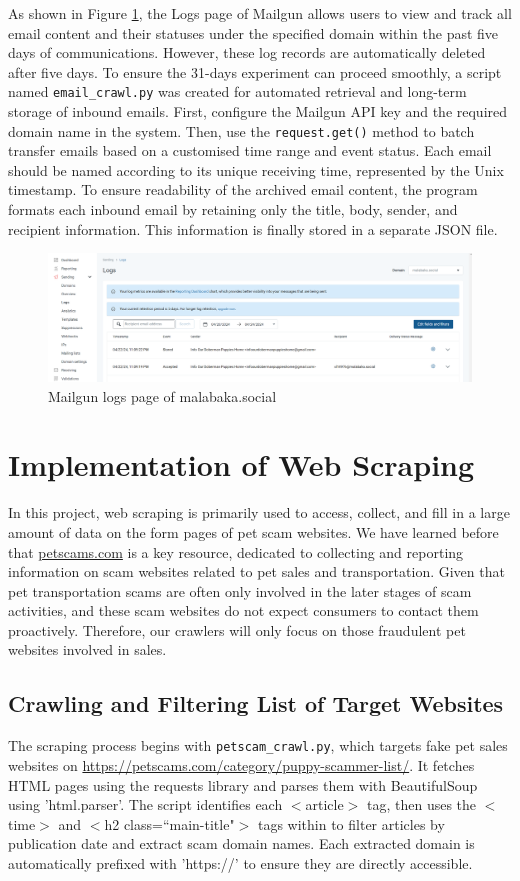 \documentclass[ oneside,%
                    author={Cassie Qing Tang},
                    degree={BSc},
                     title={An Automated Response System for Disrupting Online Pet Scamming \\ },
                    subtitle={ }]{dissertation}
\begin{document}
As shown in Figure \ref{fig:pic4}, the Logs page of Mailgun allows users to view and track all email content and their statuses under the specified domain within the past five days of communications. However, these log records are automatically deleted after five days. To ensure the 31-days experiment can proceed smoothly, a script named \texttt{email\_crawl.py} was created for automated retrieval and long-term storage of inbound emails. First, configure the Mailgun API key and the required domain name in the system. Then, use the \texttt{request.get()} method to batch transfer emails based on a customised time range and event status. Each email should be named according to its unique receiving time, represented by the Unix timestamp. To ensure readability of the archived email content, the program formats each inbound email by retaining only the title, body, sender, and recipient information. This information is finally stored in a separate JSON file.
\begin{figure}[H]
\centering
\includegraphics[width=0.95\linewidth,height=0.2\textheight]{pic/figure4.png}
\caption{Mailgun logs page of malabaka.social}
\label{fig:pic4}
\end{figure}


\section{Implementation of Web Scraping}
In this project, web scraping is primarily used to access, collect, and fill in a large amount of data on the form pages of pet scam websites. We have learned before that \href{www.petscams.com}{petscams.com} is a key resource, dedicated to collecting and reporting information on scam websites related to pet sales and transportation. Given that pet transportation scams are often only involved in the later stages of scam activities, and these scam websites do not expect consumers to contact them proactively. Therefore, our crawlers will only focus on those fraudulent pet websites involved in sales.

\subsection{Crawling and Filtering List of Target Websites}
The scraping process begins with \texttt{petscam\_crawl.py}, which targets fake pet sales websites on \url{https://petscams.com/category/puppy-scammer-list/}. It fetches HTML pages using the requests library and parses them with BeautifulSoup using 'html.parser'. The script identifies each $<$article$>$ tag, then uses the $<$time$>$ and $<$h2 class=``main-title"$>$ tags within to filter articles by publication date and extract scam domain names.  Each extracted domain is automatically prefixed with 'https://' to ensure they are directly accessible.
\\
\end{document}
